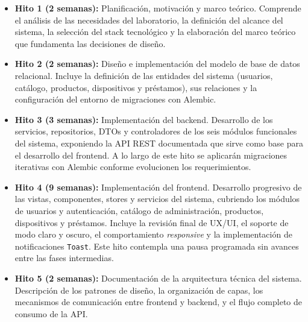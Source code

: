 \begin{itemize}
	\item \textbf{Hito 1 (2 semanas):} Planificación, motivación y marco teórico. 
	Comprende el análisis de las necesidades del laboratorio, la definición del alcance 
	del sistema, la selección del stack tecnológico y la elaboración del marco teórico 
	que fundamenta las decisiones de diseño.
	
	\item \textbf{Hito 2 (2 semanas):} Diseño e implementación del modelo de base de datos 
	relacional. Incluye la definición de las entidades del sistema (usuarios, catálogo, 
	productos, dispositivos y préstamos), sus relaciones y la configuración del entorno 
	de migraciones con Alembic.
	
	\item \textbf{Hito 3 (3 semanas):} Implementación del backend. Desarrollo de los 
	servicios, repositorios, DTOs y controladores de los seis módulos funcionales del 
	sistema, exponiendo la API REST documentada que sirve como base para el desarrollo 
	del frontend. A lo largo de este hito se aplicarán migraciones iterativas con Alembic 
	conforme evolucionen los requerimientos.
	
	\item \textbf{Hito 4 (9 semanas):} Implementación del frontend. Desarrollo progresivo 
	de las vistas, componentes, stores y servicios del sistema, cubriendo los módulos de 
	usuarios y autenticación, catálogo de administración, productos, dispositivos y 
	préstamos. Incluye la revisión final de UX/UI, el soporte de modo claro y oscuro, 
	el comportamiento \textit{responsive} y la implementación de notificaciones 
	\texttt{Toast}. Este hito contempla una pausa programada sin avances entre las fases 
	intermedias.
	
	\item \textbf{Hito 5 (2 semanas):} Documentación de la arquitectura técnica del sistema. 
	Descripción de los patrones de diseño, la organización de capas, los mecanismos de 
	comunicación entre frontend y backend, y el flujo completo de consumo de la API.
\end{itemize}